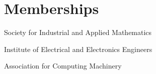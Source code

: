 \documentclass[11pt,letterpaper]{report}
\newcommand{\listitemspace}{0.25em}
\renewenvironment{itemize}
{\begin{list}{}{\setlength{\leftmargin}{0em}
                \setlength{\parskip}{0em}
                \setlength{\itemsep}{\listitemspace}
                \setlength{\parsep}{\listitemspace}}}
{\end{list}}
\begin{document}



    \section*{Memberships}

    \begin{itemize}
        \item Society for Industrial and Applied Mathematics 
        \item Institute of Electrical and Electronics Engineers 
        \item Association for Computing Machinery

    \end{itemize}











\end{document}
